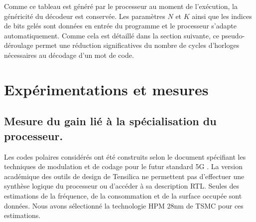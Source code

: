Comme ce tableau est généré par le processeur au moment de l'exécution, la généricité du décodeur est conservée. Les paramètres $N$ et $K$ ainsi que les indices de bits gelés sont données en entrée du programme et le processeur s'adapte automatiquement. Comme cela est détaillé dans la section suivante, ce pseudo-déroulage permet une réduction significatives du nombre de cycles d'horloges nécessaires au décodage d'un mot de code.


\section{Expérimentations et mesures}
\label{sec:tensilica_res}

\subsection{Mesure du gain lié à la spécialisation du processeur.}

Les codes polaires considérés ont été construits selon le document spécifiant les techniques de modulation et de codage pour le futur standard 5G \cite{3gpp_ts_2017-1}. 
La version académique des outils de design de Tensilica ne permettent pas d'effectuer une synthèse logique du processeur ou d'accéder à sa description RTL. Seules des estimations de la fréquence, de la consommation et de la surface occupée sont données. Nous avons sélectionné la technologie HPM 28nm de TSMC pour ces estimations.

